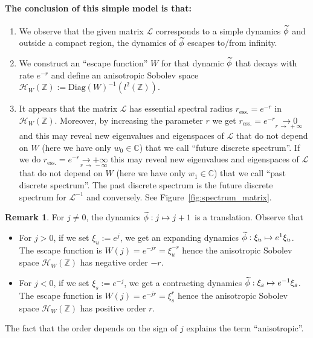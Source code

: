 \documentclass[10pt]{amsart}
\theoremstyle{definition}\newtheorem{defi}[theo]{Definition}\newtheorem{rema}[theo]{Remark}\newtheorem{exam}[theo]{Example}\newtheorem{exem}[theo]{Example}\newtheorem{nota}[theo]{Notation}
\newcommand{\clH}{\mathcal{H}}
\newcommand{\clL}{\mathcal{L}}
\newcommand{\Diag}{\mathrm{Diag}}
\newcommand{\esss}{\mathrm{ess.}}
\newcommand{\bbC}{\mathbb{C}}
\newcommand{\bbZ}{\mathbb{Z}}
\let\oldtilde\tilde
\renewcommand*{\tilde}[1]{\mathchoice{\widetilde{#1}}{\widetilde{#1}}{\oldtilde{#1}}{\oldtilde{#1}}}
\begin{document}
\paragraph{The conclusion of this simple model is that:}
\begin{enumerate}
\item We observe that the given matrix $\clL$ corresponds to a simple dynamics $\tilde{\phi}$ and outside a compact region, the dynamics of $\tilde{\phi}$ escapes to/from infinity.
\item We construct an ``escape function'' $W$ for that dynamic $\tilde{\phi}$ that decays with rate $e^{-r}$ and define an anisotropic Sobolev space $\clH _{W}(\bbZ):=\Diag(W)^{-1}(l^{2}(\bbZ))$.
\item It appears that the matrix $\clL$ has essential spectral radius $r_{\esss}=e^{-r}$ in $\clH _{W}(\bbZ)$. Moreover, by increasing the parameter $r$ we get $r_{\esss}=e^{-r}\underset{r\,\rightarrow\,+\infty}{\rightarrow0}$ and this may reveal new eigenvalues and eigenspaces of $\clL$ that do not depend on $W$ (here we have only $w_{0}\in\bbC$) that we call ``future discrete spectrum''. If we do $r_{\esss}=e^{-r}\underset{r\,\rightarrow\,-\infty}{\rightarrow+\infty}$ this may reveal new eigenvalues and eigenspaces of $\clL$ that do not depend on $W$ (here we have only $w_{1}\in\bbC$) that we call ``past discrete spectrum''. The past discrete spectrum is the future discrete spectrum for $\clL^{-1}$ and conversely. See Figure~\ref{fig:spectrum_matrix}.
\end{enumerate}
\begin{rema}
For $j\neq0$, the dynamics $\tilde{\phi}:j\mapsto j+1$ is a translation. Observe that
\begin{itemize}
\item For $j>0$, if we set $\xi_{u}:=e^{j}$, we get an expanding dynamics $\tilde{\phi}:\xi_{u}\mapsto e^{1}\xi_{u}$. The escape function is $W(j)=e^{-jr}=\xi_{u}^{-r}$ hence the anisotropic Sobolev space $\clH _{W}(\bbZ)$ has negative order $-r$.
\item For $j<0$, if we set $\xi_{s}:=e^{-j}$, we get a contracting dynamics $\tilde{\phi}:\xi_{s}\mapsto e^{-1}\xi_{s}$. The escape function is $W(j)=e^{-jr}=\xi_{s}^{r}$ hence the anisotropic Sobolev space $\clH _{W}(\bbZ)$ has positive order $r$.
\end{itemize}
The fact that the order depends on the sign of $j$ explains the term ``anisotropic''.
\end{rema}
\end{document}
